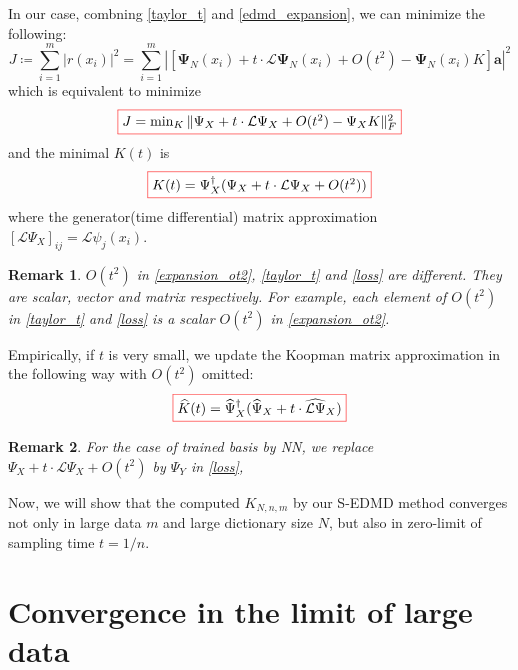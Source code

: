 \documentclass{article}[11]
\newtheorem*{remark}{Remark}
\begin{document}
	In our case, combning \eqref{taylor_t} and \eqref{edmd_expansion}, we can minimize the following:
	\begin{equation*}
		J \coloneqq \sum_{i=1}^m \left| r(x_i) \right|^2 = \sum_{i=1}^m \left| \left[\mathbf{\Psi}_N(x_i) + t \cdot \mathcal{L}\mathbf{\Psi}_N(x_i) + O(t^2) - \mathbf{\Psi}_N(x_i)K\right]\mathbf{a} \right|^2
	\end{equation*}
	which is equivalent to minimize 
	\begin{equation}\label{loss}
		\fcolorbox{red}{white}{$J = \min_{K} \| \Psi_X + t \cdot \mathcal{L}\Psi_X + O(t^2) - \Psi_X K \|_F^2$}
	\end{equation}
	and the minimal $K(t)$ is
	\begin{equation}\label{Koopman_semigroup_formula}
		\fcolorbox{red}{white}{$K(t) = \Psi_X^{\dagger}(\Psi_X + t \cdot \mathcal{L}\Psi_X + O(t^2))$}
	\end{equation}
	where the generator(time differential) matrix approximation $\left[\mathcal{L}\Psi_X\right]_{ij} = \mathcal{L}\psi_j(x_i)$. 
	\begin{remark}
		$O(t^2)$ in \eqref{expansion_ot2}, \eqref{taylor_t} and \eqref{loss} are different. They are scalar, vector and matrix respectively. For example, each element of $O(t^2)$ in \eqref{taylor_t} and \eqref{loss} is a scalar $O(t^2)$ in \eqref{expansion_ot2}.
	\end{remark}
	
	Empirically, if $t$ is very small, we update the Koopman matrix approximation in the following way with $O(t^2)$ omitted:
	\begin{equation*}
		\fcolorbox{red}{white}{$\widehat{K}(t) = \widehat{\Psi}_X^{\dagger}(\widehat{\Psi}_X + t \cdot \widehat{\mathcal{L}\Psi}_X)$}
	\end{equation*}
	\begin{remark}
		For the case of trained basis by NN, we replace $\Psi_X + t \cdot \mathcal{L}\Psi_X + O(t^2)$ by $\Psi_Y$ in \eqref{loss}, 
	\end{remark}
	
	Now, we will show that the computed $K_{N,n,m}$ by our S-EDMD method converges not only in large data $m$ and large dictionary size $N$, but also in zero-limit of sampling time $t=1/n$.
	
	\newpage
	\section{Convergence in the limit of large data}
	
\end{document}
